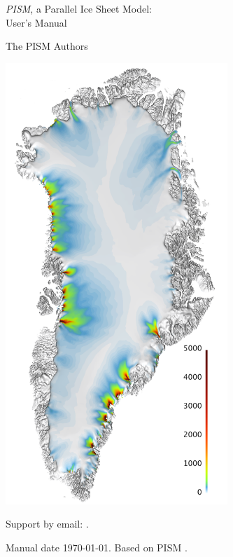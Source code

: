\documentclass[titlepage,letterpaper,final]{scrartcl}
\begin{document}
\graphicspath{{figs/}}

\begin{titlepage}

  \begin{center}
    {\huge{} \emph{PISM}, a Parallel Ice Sheet Model:\\\medskip User's Manual}
    \vspace{0.5cm}

    {\Large The PISM Authors}
    \vspace{1cm}

    \includegraphics[width=3.3in,keepaspectratio=true]{grn-1km-csurf}
    \vfill

    \small Support by email: \PISMEMAIL.
    \medskip

    Manual date \today. Based on PISM \PISMREV.
    \medskip

  \end{center}
\end{titlepage}

\newpage
\phantom{bob}
\end{document}
